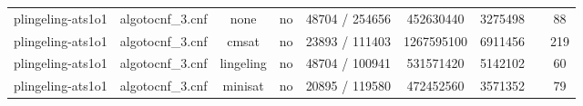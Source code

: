 \begin{appendices}
\begin{table}[p]
\begin{center}
\begin{tabular}{l|cccccccc}
  plingeling-ats1o1              & algotocnf\_3.cnf               & none       & no    & 48704 / 254656 & 452630440 & 3275498   &            & 88 \\ %
  plingeling-ats1o1              & algotocnf\_3.cnf               & cmsat      & no    & 23893 / 111403 & 1267595100 & 6911456   &            & 219 \\ %
  plingeling-ats1o1              & algotocnf\_3.cnf               & lingeling  & no    & 48704 / 100941 & 531571420 & 5142102   &            & 60 \\ %
  plingeling-ats1o1              & algotocnf\_3.cnf               & minisat    & no    & 20895 / 119580 & 472452560 & 3571352   &            & 79 \\ %
    \end{tabular}
  \end{center}
\end{table}

\newpage


\end{appendices}
